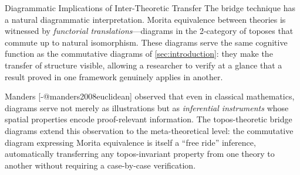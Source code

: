 \documentclass[
  ignorenonframetext,
]{beamer}
\begin{document}
\begin{frame}{Diagrammatic Implications of Inter-Theoretic Transfer}
\protect{}\label{diagrammatic-implications-of-inter-theoretic-transfer}
The bridge technique has a natural diagrammatic interpretation. Morita
equivalence between theories is witnessed by \emph{functorial
translations}---diagrams in the 2-category of toposes that commute up to
natural isomorphism. These diagrams serve the same cognitive function as
the commutative diagrams of \autoref{sec:introduction}: they make the
transfer of structure visible, allowing a researcher to verify at a
glance that a result proved in one framework genuinely applies in
another.

Manders {[}-@manders2008euclidean{]} observed that even in classical
mathematics, diagrams serve not merely as illustrations but as
\emph{inferential instruments} whose spatial properties encode
proof-relevant information. The topos-theoretic bridge diagrams extend
this observation to the meta-theoretical level: the commutative diagram
expressing Morita equivalence is itself a ``free ride'' inference,
automatically transferring any topos-invariant property from one theory
to another without requiring a case-by-case verification.
\end{frame}
\end{document}
